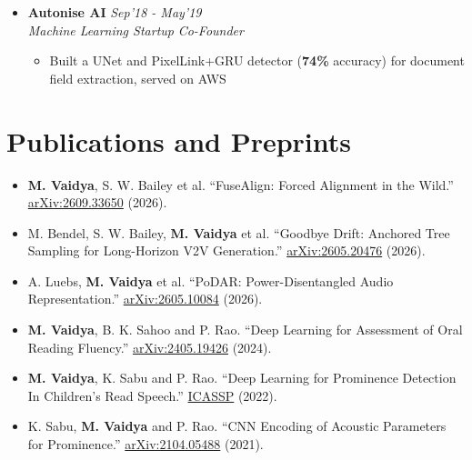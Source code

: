 \documentclass[10pt,letterpaper,sans]{moderncv}
\providecommand{\sl}{\slshape}
\begin{document}
\begin{itemize}
\vspace{-8pt}
\begin{itemize}
\item Implemented SystemVerilog-C DPI for \textbf{3x} faster verification, auto-generating JSON bindings via Python metaclasses
\end{itemize}
\item \textbf{Autonise AI} \hfill{\sl Sep'18 - May'19}\\
\textit{Machine Learning Startup} \hfill {\sl Co-Founder}\\
\vspace{-8pt}
\begin{itemize}
\item Built a UNet and PixelLink+GRU detector (\textbf{74\%} accuracy) for document field extraction, served on AWS
\end{itemize}
\end{itemize}
\renewcommand{\itemhooki}{\setlength{\itemsep}{0.15em}}
\section{Publications and Preprints}
\begin{itemize}
\item \textbf{M. Vaidya}, S. W. Bailey et al. ``FuseAlign: Forced Alignment in the Wild.'' \href{https://arxiv.org/abs/2609.33650}{arXiv:2609.33650} (2026).
\item M. Bendel, S. W. Bailey, \textbf{M. Vaidya} et al. ``Goodbye Drift: Anchored Tree Sampling for Long-Horizon V2V Generation.'' \href{https://arxiv.org/abs/2605.20476}{arXiv:2605.20476} (2026).
\item A. Luebs, \textbf{M. Vaidya} et al. ``PoDAR: Power-Disentangled Audio Representation.'' \href{https://arxiv.org/abs/2605.10084}{arXiv:2605.10084} (2026).
\item \textbf{M. Vaidya}, B. K. Sahoo and P. Rao. ``Deep Learning for Assessment of Oral Reading Fluency.'' \href{https://arxiv.org/abs/2405.19426}{arXiv:2405.19426} (2024).
\item \textbf{M. Vaidya}, K. Sabu and P. Rao. ``Deep Learning for Prominence Detection In Children's Read Speech.'' \href{https://doi.org/10.1109/ICASSP43922.2022.9747780}{ICASSP} (2022).
\item K. Sabu, \textbf{M. Vaidya} and P. Rao. ``CNN Encoding of Acoustic Parameters for Prominence.'' \href{https://arxiv.org/abs/2104.05488}{arXiv:2104.05488} (2021).
\end{itemize}
\renewcommand{\itemhooki}{\setlength{\itemsep}{0.32em}}
\end{document}
